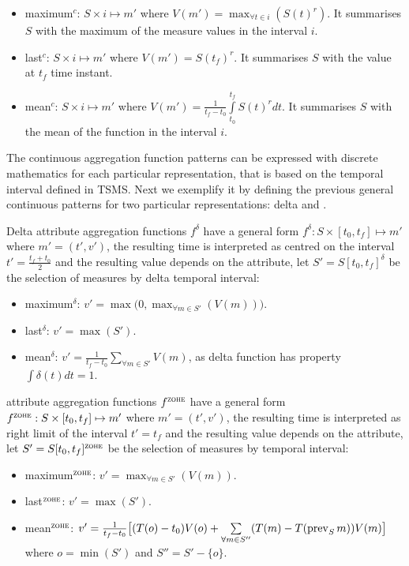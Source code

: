 \begin{itemize}
\item maximum$^c$: $S \times i \mapsto m'$ where $V(m') =
  \max_{\forall t \in i}(S(t)^r)$. It summarises $S$ with the maximum
  of the measure values in the interval $i$.
\item last$^c$: $S \times i \mapsto m'$ where $V(m') = S(t_f)^r$. It
  summarises $S$ with the value at $t_f$ time instant.
\item mean$^c$: $S \times i \mapsto m'$ where $V(m') =
  \frac{1}{t_f-t_0} \int\limits_{t_0}^{t_f} S(t)^r dt$. It summarises $S$
  with the mean of the function in the interval $i$.
\end{itemize}


The continuous aggregation function patterns can be expressed with
discrete mathematics for each particular representation, that is based
on the temporal interval defined in TSMS. Next we exemplify it by
defining the previous general continuous patterns for two particular
representations: delta and \zohe{}.


Delta attribute aggregation functions $f^\delta$ have a general form
$f^\delta : S \times [t_0,t_f]\mapsto m'$ where $m'=(t',v')$, the
resulting time is interpreted as centred on the interval
$t'=\frac{t_f+t_0}{2}$ and the resulting value depends on the
attribute, let $S'=S[t_0,t_f]^\delta$ be the selection of measures by
delta temporal interval:
\begin{itemize}
\item maximum$^\delta$: $v' = \max\big(0,\max_{\forall m \in S'}(V(m))\big)$. 
\item last$^\delta$: $v' = \max(S')$.
\item mean$^\delta$: $v' = \frac{1}{t_f-t_0} \sum\limits_{\forall m
    \in S'} V(m)$, as delta function has property $\int\delta(t)dt=1$.
\end{itemize}


\zohe{} attribute aggregation functions $f^\zohe{}$ have a general
form $f^\zohe{} : S \times [t_0,t_f]\mapsto m'$ where $m'=(t',v')$,
the resulting time is interpreted as right limit of the interval
$t'=t_f$ and the resulting value depends on the attribute, let
$S'=S[t_0,t_f]^\zohe{}$ be the selection of measures by \zohe{} temporal
interval:
\begin{itemize}
\item maximum$^\zohe{}$: $v' = \max_{\forall m \in S'}(V(m))$. 
\item last$^\zohe{}$: $v' = \max(S')$.
\item mean$^\zohe{}$: $v' = \frac{1}{t_f-t_0} \big[ (T(o)-t_0)V(o) +
  \sum\limits_{\forall m \in S''}( T(m)- T(\operatorname*{prev}_S
  m) )V(m) \big]$ where $o=\min(S')$ and $S''= S' - \{o\}$.
\end{itemize}

